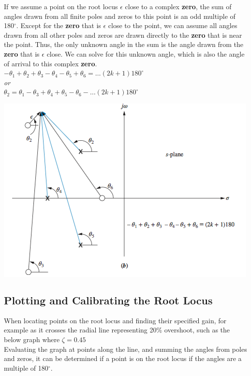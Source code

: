 \documentclass[11pt]{article}
\begin{document}
    If we assume a point on the root locus $\epsilon$ close to a complex \textbf{zero}, the sum of angles drawn from all finite poles and zeros to this point is an odd multiple of 180$^\circ$. Except for the \textbf{zero} that is $\epsilon$ close to the point, we can assume all angles drawn from all other poles and zeros are drawn directly to the \textbf{zero} that is near the point. Thus, the only unknown angle in the sum is the angle drawn from the \textbf{zero} that is $\epsilon$ close. We can solve for this unknown angle, which is also the angle of arrival to this complex \textbf{zero}. \\ 

    $-\theta_1 + \theta_2 + \theta_3 - \theta_4 - \theta_5 + \theta_6 =(2k+1)180^\circ$ \\ 
    
    \textit{or} \\ 

    $\theta_2 = \theta_1 - \theta_3 + \theta_4 + \theta_5 - \theta_6 -(2k+1)180^\circ$ \\

    \begin{center}
        \includegraphics[width=300 px]{img/angles-zero} \\
    \end{center}  

    \subsection{Plotting and Calibrating the Root Locus}

    When locating points on the root locus and finding their specified gain, for example as it crosses the radial line representing 20\% overshoot, such as the below graph where $\zeta = 0.45$ \\ 

    Evaluating the graph at points along the line, and summing the angles from poles and zeros, it can be determined if a point is on the root locus if the angles are a multiple of 180$^\circ$.
\end{document}
